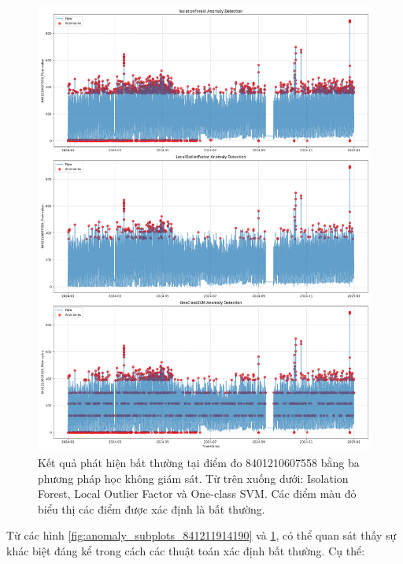 \begin{figure}[H]
    \centering
    \includegraphics[width=\textwidth]{image/section6_1/anomalies_subplots_8401210607558.png}
    \caption{Kết quả phát hiện bất thường tại điểm đo 8401210607558 bằng ba phương pháp học không giám sát. Từ trên xuống dưới: Isolation Forest, Local Outlier Factor và One-class SVM. Các điểm màu đỏ biểu thị các điểm được xác định là bất thường.}
    \label{fig:anomaly_subplots_8401210607558}
\end{figure}

Từ các hình \ref{fig:anomaly_subplots_841211914190} và \ref{fig:anomaly_subplots_8401210607558}, có thể quan sát thấy sự khác biệt đáng kể trong cách các thuật toán xác định bất thường. Cụ thể:

